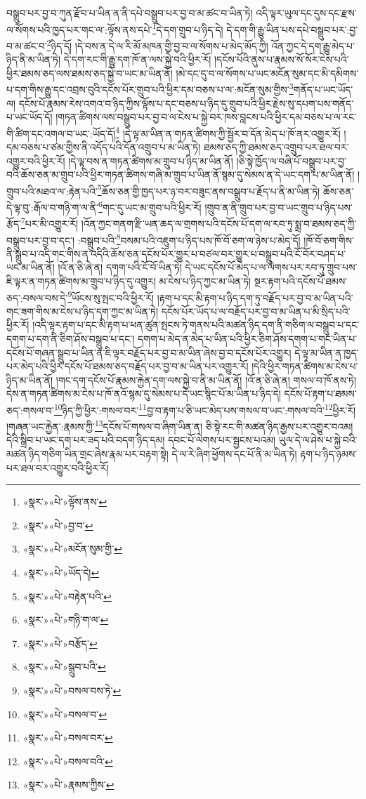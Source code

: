 བསྒྲུབ་པར་བྱ་བ་ཀུན་རྫོབ་པ་ཡིན་ན་ནི་དཔེ་བསྒྲུབ་པར་བྱ་བ་མ་ཚང་བ་ཡིན་ཏེ། འདི་ལྟར་ཡུལ་དང་དུས་དང་རྫས་ལ་སོགས་པའི་ཁྱད་པར་གང་ལ་:ལྟོས་ནས་དཔེ་\footnote{«སྣར་»«པེ་»ལྟོས་ནས་}དེ་དག་གྲུབ་པ་ཉིད་དེ། དེ་དག་གི་རྒྱུ་ཡིན་པས་དཔེ་བསྒྲུབ་པར་:བྱ་བ་མ་ཚང་བ་\footnote{«སྣར་»«པེ་»བྱ་བ་}ཉིད་དོ། །དེ་བས་ན་དེ་ལ་རི་མོ་མཁན་གྱི་བྱ་བ་ལ་སོགས་པ་མེད་མོད་ཀྱི། འོན་ཀྱང་དེ་དག་རྒྱུ་མེད་པ་ཉིད་ནི་མ་ཡིན་ཏེ། དེ་དག་རང་གི་རྒྱུ་དག་ཁོ་ན་ལས་སྐྱེ་བའི་ཕྱིར་རོ། །དངོས་པོའི་ནུས་པ་རྣམས་སོ་སོར་ངེས་པའི་ཕྱིར་ཐམས་ཅད་ལས་ཐམས་ཅད་སྐྱེ་བ་ཡང་མ་ཡིན་ནོ། །མེ་དང་དུ་བ་ལ་སོགས་པ་ཡང་མངོན་སུམ་དང་མི་དམིགས་པ་དག་གིས་རྒྱུ་དང་འབྲས་བུའི་དངོས་པོར་གྲུབ་པའི་ཕྱིར་དམ་བཅས་པ་ལ་:མངོན་སུམ་གྱིས་\footnote{«སྣར་»«པེ་»མངོན་སུམ་གྱི་}གནོད་པ་ཡང་ཡོད་ལ། དངོས་པོ་རྣམས་རེས་འགའ་བ་ཉིད་ཀྱིས་ལྟོས་པ་དང་བཅས་པ་ཉིད་དུ་གྲུབ་པའི་ཕྱིར་རྗེས་སུ་དཔག་པས་གནོད་པ་ཡང་ཡོད་དོ། །གཏན་ཚིགས་ལས་བསྒྲུབ་པར་བྱ་བ་ལ་ངེས་པ་སྐྱེ་བར་ཁས་བླངས་པའི་ཕྱིར་དམ་བཅས་པ་ལ་རང་གི་ཚིག་དང་འགལ་བ་ཡང་:ཡོད་དོ།\footnote{«སྣར་»«པེ་»ཡོད་དེ།} །དེ་ལྟ་མ་ཡིན་ན་གཏན་ཚིགས་ཀྱི་སྦྱོར་བ་དོན་མེད་པ་ཁོ་ནར་འགྱུར་རོ། །དམ་བཅས་པ་ཙམ་གྱིས་ནི་འདོད་པའི་དོན་འགྲུབ་པ་མ་ཡིན་ཏེ། ཐམས་ཅད་ཀྱི་ཐམས་ཅད་འགྲུབ་པར་ཐལ་བར་འགྱུར་བའི་ཕྱིར་རོ། །དེ་ལྟ་བས་ན་གཏན་ཚིགས་མ་གྲུབ་པ་ཉིད་མ་ཡིན་ནོ། །ཅི་སྟེ་ཁྱོད་ལ་བཞི་པོ་བསྒྲུབ་པར་བྱ་བའི་ཆོས་ཅན་མ་གྲུབ་པའི་ཕྱིར་གཏན་ཚིགས་གཞི་མ་གྲུབ་པ་ཡིན་ནོ་སྙམ་དུ་སེམས་ན་དེ་ཡང་དག་པ་མ་ཡིན་ནོ། །གྲུབ་པའི་མཐའ་ལ་:རྟེན་པའི་\footnote{«སྣར་»«པེ་»བརྟེན་པའི་}ཆོས་ཅན་གྱི་ཁྱད་པར་ཉ་བར་བཟུང་ནས་བསྒྲུབ་པ་རྗོད་པ་ནི་མ་ཡིན་ཏེ། ཆོས་ཅན་དེ་ལྟ་བུ་:རྒོལ་བ་གཉི་ག་ལ་ནི་\footnote{«སྣར་»«པེ་»གཉི་ག་ལ་}གང་དུ་ཡང་མ་གྲུབ་པའི་ཕྱིར་རོ། །གྲུབ་ན་ནི་གྲུབ་པར་བྱ་བ་ཡང་གྲུབ་པ་ཉིད་པས་རྩོད་\footnote{«སྣར་»«པེ་»བརྩོད་}པར་མི་འགྱུར་རོ། །འོན་ཀྱང་གནག་རྫི་ཡན་ཆད་ལ་གྲགས་པའི་དངོས་པོ་དག་ལ་རབ་ཏུ་སྨྲ་བ་ཐམས་ཅད་ཀྱི་བསྒྲུབ་པར་བྱ་བ་དང་། :བསྒྲུབ་པའི་\footnote{«སྣར་»«པེ་»སྒྲུབ་པའི་}བསམ་པའི་འཇུག་པ་ཉིད་པས་ཁོ་བོ་ཅག་ལ་ཉེས་པ་མེད་དོ། །ཁོ་བོ་ཅག་གིས་ནི་སྒྲུབ་པ་འདི་གང་གིས་ན་འདིའི་ཆོས་ཅན་དངོས་པོར་གྱུར་པ་བཙལ་བར་གྱུར་པ་བསྒྲུབ་པའི་ངོ་བོར་བཤད་པ་ཡང་མ་ཡིན་ནོ། །འོ་ན་ཅི་ཞེ་ན། དགག་པའི་ངོ་བོ་ཡིན་ཏེ། དེ་ཡང་དངོས་པོ་མེད་པ་ལ་ལེགས་པར་རབ་ཏུ་གྲུབ་པས་ཇི་ལྟར་ན་གཏན་ཚིགས་མ་གྲུབ་པ་ཉིད་དུ་འགྱུར། མ་ངེས་པ་ཉིད་ཀྱང་མ་ཡིན་ཏེ། སྔར་རྟག་པའི་དངོས་པོ་ཐམས་ཅད་:བསལ་བས་དེ་\footnote{«སྣར་»«པེ་»བསལ་བས་ཏེ་}ཡོངས་སུ་སྤང་བའི་ཕྱིར་རོ། །རྟག་པ་དང་མི་རྟག་པ་ཉིད་དག་ཏུ་བརྗོད་པར་བྱ་བ་མ་ཡིན་པའི་གང་ཟག་གིས་མ་ངེས་པ་ཉིད་དག་ཀྱང་མ་ཡིན་ཏེ། དངོས་པོར་ཡོད་པ་ལ་བརྗོད་པར་བྱ་བ་མ་ཡིན་པ་མི་སྲིད་པའི་ཕྱིར་རོ། །འདི་ལྟར་རྟག་པ་དང་མི་རྟག་པ་ཕན་ཚུན་སྤངས་ཏེ་གནས་པའི་མཚན་ཉིད་དག་ནི་གཅིག་ལ་བསྒྲུབ་པ་དང་དགག་པ་དག་ནི་ཅིག་ཤོས་བསྒྲུབ་པ་དང་། དགག་པ་མེད་ན་མེད་པ་ཡིན་པའི་ཕྱིར་ཅིག་ཤོས་དགག་པ་གང་ཡིན་པ་དངོས་པོ་གཞན་སྒྲུབ་པ་ཡིན་ན་ཇི་ལྟར་བརྗོད་པར་བྱ་བ་མ་ཡིན་ཞེས་བྱ་བ་དངོས་པོར་འགྱུར། དེ་ལྟ་མ་ཡིན་ན་ཁྱད་པར་མེད་པའི་ཕྱིར་དངོས་པོ་ཐམས་ཅད་བརྗོད་པར་བྱ་བ་མ་ཡིན་པར་འགྱུར་རོ། །དེའི་ཕྱིར་གཏན་ཚིགས་མ་ངེས་པ་ཉིད་མ་ཡིན་ནོ། །གང་དག་དངོས་པོ་རྣམས་རྐྱེན་དག་ལས་སྐྱེ་བ་ནི་མ་ཡིན་ནོ། །འོ་ན་ཅི་ཞེ་ན། གསལ་བ་ཁོ་ནས་ཏེ། དེས་ན་གཏན་ཚིགས་མ་ངེས་པ་ཁོ་ནའོ་སྙམ་དུ་སེམས་པ་དེ་ཡང་སྙིང་པོ་མ་ཡིན་པ་ཉིད་དེ། དངོས་པོ་རྟག་པ་ཐམས་ཅད་:གསལ་བ་\footnote{«སྣར་»«པེ་»བསལ་བ་}ཉིད་ཀྱི་ཕྱིར་:གསལ་བར་\footnote{«སྣར་»«པེ་»བསལ་བར་}བྱ་བ་རྟག་པ་ཅི་ཡང་མེད་པས་གསལ་བ་ཡང་:གསལ་བའི་\footnote{«སྣར་»«པེ་»བསལ་བའི་}ཕྱིར་རོ། །གཞན་ཡང་རྐྱེན་:རྣམས་ཀྱི་\footnote{«སྣར་»«པེ་»རྣམས་ཀྱིས་}དངོས་པོ་གསལ་བ་ཞིག་ཡིན་ན། ཅི་སྟེ་རང་གི་མཚན་ཉིད་རྒྱས་པར་འགྱུར་བའམ། དེའི་སྒྲིབ་པ་ཡང་དག་པར་ཟད་པའི་བདག་ཉིད་དམ། དབང་པོ་ལེགས་པར་སྦྱངས་པའམ། ཡུལ་དེ་ལ་ཤེས་པ་སྐྱེ་བའི་མཚན་ཉིད་གཅིག་ཡིན་གྲང་ཞེས་རྣམ་པར་བརྟག་སྟེ། དེ་ལ་རེ་ཞིག་ཕྱོགས་དང་པོ་ནི་མ་ཡིན་ཏེ། རྟག་པ་ཉིད་ཉམས་པར་ཐལ་བར་འགྱུར་བའི་ཕྱིར་རོ། 